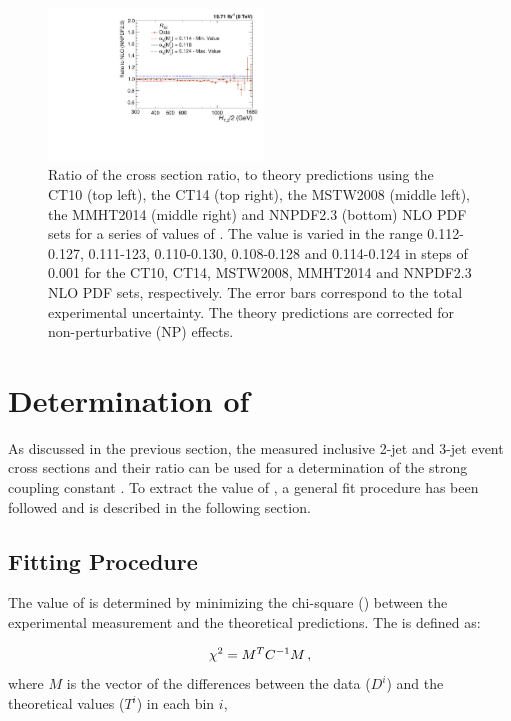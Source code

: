 \begin{figure}[!htbp]
\begin{center}
 \vspace*{3mm}
 \includegraphics[width=0.51\textwidth]{Plots_HT_2_150/Sensitivity_double_ratio_32_NNPDF23.pdf}
 \caption{Ratio of the cross section ratio, \ratio to theory predictions using the CT10 (top left), the CT14 (top right), the MSTW2008 (middle left), the MMHT2014 (middle right) and NNPDF2.3 (bottom) NLO PDF sets for a series of values of \alpsmz. The \alpsmz value is varied in the range 0.112-0.127, 0.111-123, 0.110-0.130, 0.108-0.128 and 0.114-0.124 in steps of 0.001 for the CT10, CT14, MSTW2008, MMHT2014 and NNPDF2.3 NLO PDF sets, respectively. The error bars correspond to the total experimental uncertainty. The theory predictions are corrected for non-perturbative (NP) effects.}
 \label{fig:sensitivity_double_ratio}
 \end{center}
\end{figure}

\section{Determination of \texorpdfstring{\alpsmz}{alpha-S(M(Z))}}

As discussed in the previous section, the measured inclusive 2-jet and 3-jet event cross sections and their ratio \ratio can be used for a determination of the strong coupling constant \alpsmz. To extract the value of \alpsmz, a general fit procedure \cite{Chatrchyan:2013txa,Khachatryan:2014waa} has been followed and is described in the following section. 

\subsection{Fitting Procedure}
\label{sec:Fits}
The value of \alpsmz is determined by minimizing the chi-square (\chisq) between the experimental measurement and the theoretical predictions. The \chisq is defined as:

\begin{equation}
  \label{chisq}
  \chi^2 = M^{T}C^{-1}M\,,
\end{equation}
where $M$ is the vector of the differences between the data ($D^{i}$) and the theoretical values ($T^{i}$) in each bin $i$,

